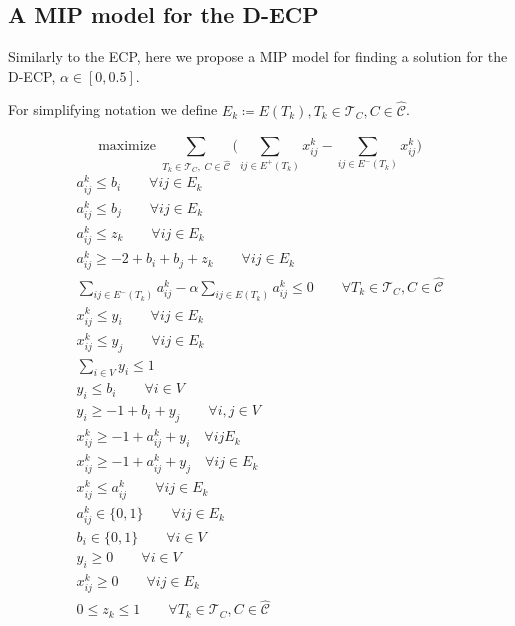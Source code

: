 \subsection{A MIP model for the \acrshort{D-ECP}}%
\label{sub:a_mip_model_for_the_d_ecp}

Similarly to the \acrshort{ECP}, here we propose a \acrshort{MIP} model for
finding a solution for the \acrshort{D-ECP}, $\alpha \in [0, 0.5]$.

For simplifying notation we define $E_{k} \coloneqq E(T_{k}), T_{k} \in
	\mathcal{T}_{C}, C \in \mathcal{\hat{C}}$.

\begin{equation}
	\text{maximize} \; \sum_{ T_{k} \in \mathcal{T}_{C}, \; C \in
		\mathcal{\hat{C}} } \big( \sum^{}_{ij \in E^{+} (T_{k})} x_{ij}
		^{k} - \sum_{ij \in E^{-} (T_{k})} x_{ij} ^{k} \big)
\end{equation}
\begin{gather}
	\label{eq:d-ecp-a-ij-l-bi}
	a_{ij}^{k} \leq b_{i} \quad\quad \forall ij \in E_k \\
	\label{eq:d-ecp-a-ij-l-bj}
	a_{ij}^{k} \leq b_{j} \quad\quad \forall ij \in E_k \\
	\label{eq:d-ecp-a-ij-l-zk}
	a_{ij}^{k} \leq z_k  \quad\quad \forall ij \in E_k \\
	\label{eq:d-ecp-a-ij-g-ijk}
	a _{ij} ^{k} \geq - 2 + b_i + b_j + z_k \quad\quad \forall ij \in E_k \\
	\label{eq:d-ecp-alpha-constraint}
	\sum^{}_{ij \in E^{-} (T_k)} a_{ij}^{k}  - \alpha \sum^{}_{ij \in E(T_k)}
	a_{ij} ^{k}  \leq 0 \quad\quad \forall T_{k} \in \mathcal{T} _{C}, C \in
	\hat{\mathcal{C}} \\
	\label{eq:d-ecp-edge-charikar1}
	x _{ij}^{k}  \leq y_i \quad\quad \forall ij \in E_{k} \\
	\label{eq:d-ecp-edge-charikar2}
	x _{ij} ^{k} \leq y_j \quad\quad \forall ij \in E_k \\
	\label{eq:d-ecp-vertex-charikar1}
	\sum^{}_{i \in V} y_i \leq 1 \\
	\label{eq:d-ecp-}
	y_i \leq b_i \quad\quad \forall i \in V \\
	\label{eq:d-ecp-}
	y_i \geq -1 + b_i + y_j \quad\quad \forall i,j \in V \\
	\label{eq:d-ecp-}
	x_{ij}^{k} \geq -1 + a_{ij} ^{k} + y_i \quad \forall ij E_k \\
	\label{eq:d-ecp-}
	x_{ij}^{k} \geq -1 + a_{ij} ^{k} + y_j \quad \forall ij \in E_k \\
	\label{eq:d-ecp-}
	x_{ij} ^{k} \leq a_{ij} ^{k} \quad\quad \forall ij \in E_k \\
	\label{eq:d-ecp-a-ij}
	a _{ij} ^{k}  \in \{0, 1\} \quad\quad \forall ij \in E_k\\
	\label{eq:d-ecp-b-i}
	b _{i} \in \{0, 1\} \quad\quad \forall i \in V \\
	\label{eq:d-ecp-y-i}
	y _{i} \geq 0 \quad\quad \forall i \in V \\
	\label{eq:d-ecp-x-ij}
	x _{ij} ^{k}  \geq 0 \quad\quad \forall ij \in E_k\\
	\label{eq:d-ecp-z-k}
	0 \leq z _{k} \leq 1 \quad\quad \forall T_{k} \in \mathcal{T} _{C}, C \in
	\hat{\mathcal{C}}
\end{gather}

